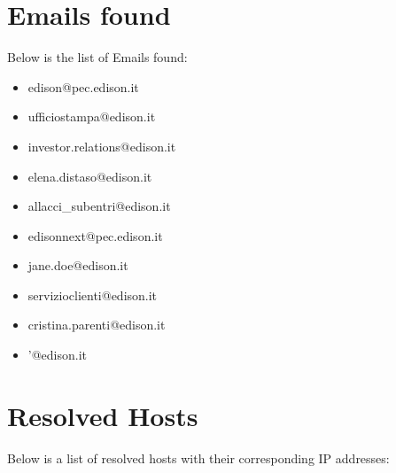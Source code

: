 \documentclass{article}
\begin{document}
\section*{Emails found}

Below is the list of Emails found:

\begin{itemize}
    
        \item edison@pec.edison.it
    
        \item ufficiostampa@edison.it
    
        \item investor.relations@edison.it
    
        \item elena.distaso@edison.it
    
        \item allacci\_subentri@edison.it
    
        \item edisonnext@pec.edison.it
    
        \item jane.doe@edison.it
    
        \item servizioclienti@edison.it
    
        \item cristina.parenti@edison.it
    
        \item '@edison.it
    
\end{itemize}

\section*{Resolved Hosts}

Below is a list of resolved hosts with their corresponding IP addresses:
\end{document}
